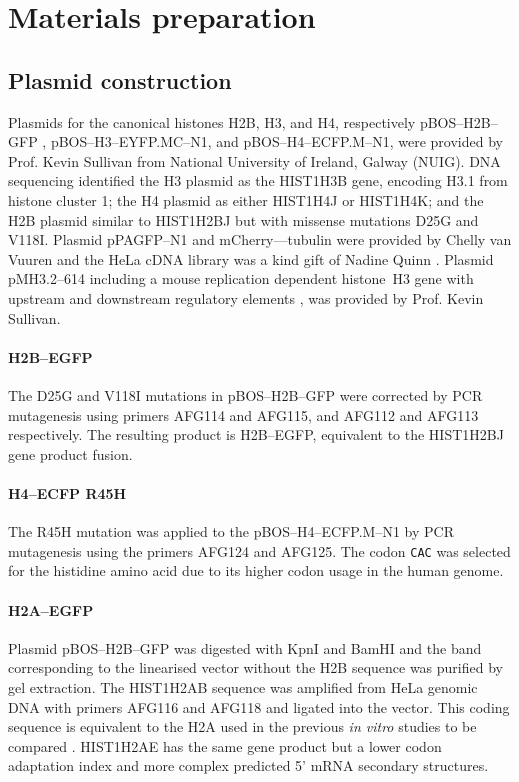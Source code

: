 \section{Materials preparation}


  \subsection{Plasmid construction}

    Plasmids for the canonical histones H2B, H3, and H4,
    respectively pBOS--H2B--GFP \citep{KevinH2BGFP},
    pBOS--H3--EYFP.MC--N1, and pBOS--H4--ECFP.M--N1,
    were provided by Prof. Kevin Sullivan from National University of Ireland,
    Galway (NUIG). DNA sequencing identified the H3 plasmid as the HIST1H3B gene,
    encoding H3.1 from histone cluster 1; the H4 plasmid as either HIST1H4J or HIST1H4K;
    and the H2B plasmid similar to HIST1H2BJ but with missense mutations D25G and V118I.
    Plasmid pPAGFP--N1 and mCherry--\textalpha--tubulin were provided by Chelly van Vuuren
    and the HeLa cDNA library was a kind gift of Nadine Quinn \citep{NadineThesis}.
    Plasmid pMH3.2--614 including a mouse replication dependent histone~H3
    gene with upstream and downstream regulatory elements \citep{pMH3-plasmid},
    was provided by Prof. Kevin Sullivan.

    \paragraph{H2B--EGFP}
      The D25G and V118I mutations in pBOS--H2B--GFP were corrected by PCR mutagenesis
      using primers AFG114 and AFG115, and AFG112 and AFG113 respectively.
      The resulting product is H2B--EGFP, equivalent to the HIST1H2BJ gene product fusion.

    \paragraph{H4--ECFP R45H}
      The R45H mutation was applied to the pBOS--H4--ECFP.M--N1 by
      PCR mutagenesis using the primers AFG124 and AFG125. The codon
      \texttt{CAC} was selected for the histidine amino acid due to its
      higher codon usage in the human genome\citep{codon_usage}.

    \paragraph{H2A--EGFP}
      Plasmid pBOS--H2B--GFP was digested with KpnI and BamHI
      and the band corresponding to the linearised vector without the H2B sequence
      was purified by gel extraction. The HIST1H2AB sequence was amplified
      from HeLa genomic DNA with primers AFG116 and AFG118 and ligated into the vector.
      This coding sequence is equivalent to the H2A used in the previous
      \textit{in vitro} studies to be compared \citep{flaus2004sin}.
      HIST1H2AE has the same gene product but a lower codon adaptation index
      and more complex predicted 5' mRNA secondary structures.

